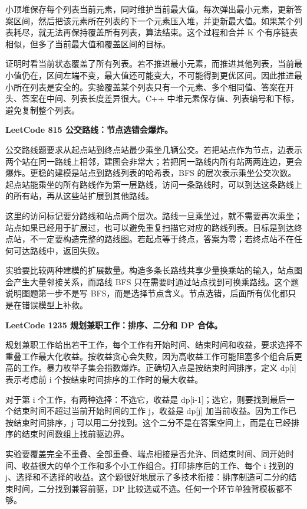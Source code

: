 小顶堆保存每个列表当前元素，同时维护当前最大值。每次弹出最小元素，更新答案区间，然后把该元素所在列表的下一个元素压入堆，并更新最大值。如果某个列表耗尽，就无法再保持覆盖所有列表，算法结束。这个过程和合并 K 个有序链表相似，但多了当前最大值和覆盖区间的目标。

证明时看当前状态覆盖了所有列表。若不推进最小元素，而推进其他列表，当前最小值仍在，区间左端不变，最大值还可能变大，不可能得到更优区间。因此推进最小所在列表是安全的。实验覆盖某个列表只有一个元素、多个相同值、答案在开头、答案在中间、列表长度差异很大。C++ 中堆元素保存值、列表编号和下标，避免复制整个列表。

\noindent\textbf{LeetCode 815 公交路线：节点选错会爆炸。}

公交路线题要求从起点站到终点站最少乘坐几辆公交。若把站点作为节点，边表示两个站在同一路线上相邻，建图会非常大；若把同一路线内所有站两两连边，更会爆炸。更稳的建模是站点到路线列表的哈希表，BFS 的层次表示乘坐公交次数。起点站能乘坐的所有路线作为第一层路线，访问一条路线时，可以到达这条路线上的所有站，再从这些站扩展到其他路线。

这里的访问标记要分路线和站点两个层次。路线一旦乘坐过，就不需要再次乘坐；站点如果已经用于扩展过，也可以避免重复扫描它对应的路线列表。目标是到达终点站，不一定要构造完整的路线图。若起点等于终点，答案为零；若终点站不在任何可达路线中，返回失败。

实验要比较两种建模的扩展数量。构造多条长路线共享少量换乘站的输入，站点图会产生大量邻接关系，而路线 BFS 只在需要时通过站点找到可换乘路线。这个题说明图题第一步不是写 BFS，而是选择节点含义。节点选错，后面所有优化都只是在错误模型上补救。

\noindent\textbf{LeetCode 1235 规划兼职工作：排序、二分和 DP 合体。}

规划兼职工作给出若干工作，每个工作有开始时间、结束时间和收益，要求选择不重叠工作最大化收益。按收益贪心会失败，因为高收益工作可能阻塞多个组合后更高的工作。暴力枚举子集会指数爆炸。正确切入点是按结束时间排序，定义 dp[i] 表示考虑前 i 个按结束时间排序的工作时的最大收益。

对于第 i 个工作，有两种选择：不选它，收益是 dp[i-1]；选它，则要找到最后一个结束时间不超过当前开始时间的工作 j，收益是 dp[j] 加当前收益。因为工作已按结束时间排序，j 可以用二分找到。这个二分不是在答案空间上，而是在已经排序的结束时间数组上找前驱边界。

实验要覆盖完全不重叠、全部重叠、端点相接是否允许、同结束时间、同开始时间、收益很大的单个工作和多个小工作组合。打印排序后的工作、每个 i 找到的 j、选择和不选择的收益。这个题很好地展示了多技术衔接：排序制造可二分的结束时间，二分找到兼容前驱，DP 比较选或不选。任何一个环节单独背模板都不够。

